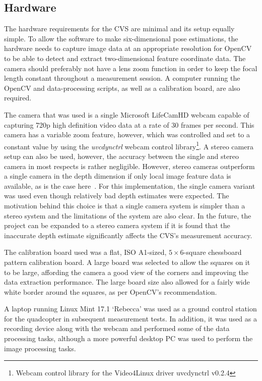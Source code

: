 \subsection{Hardware}

The hardware requirements for the CVS are minimal and its setup equally simple. To allow the software to make six-dimensional pose estimations, the hardware needs to capture image data at an appropriate resolution for OpenCV to be able to detect and extract two-dimensional feature coordinate data. The camera should preferably not have a lens zoom function in order to keep the focal length constant throughout a measurement session. A computer running the OpenCV and data-processing scripts, as well as a calibration board, are also required. 

The camera that was used is a single Microsoft LifeCamHD webcam capable of capturing 720p high definition video data at a rate of 30 frames per second. This camera has a variable zoom feature, however, which was controlled and set to a constant value by using the \emph{uvcdynctrl} webcam control library\footnote{Webcam control library for the Video4Linux driver uvcdynctrl v0.2.4}. A stereo camera setup can also be used, however, the accuracy between the single and stereo camera in most respects is rather negligible. However, stereo cameras outperform a single camera in the depth dimension if only local image feature data is available, as is the case here~\citep{saxena20083}.  For this implementation, the single camera variant was used even though relatively bad depth estimates were expected. The motivation behind this choice is that a single camera system is simpler than a stereo system and the limitations of the system are also clear. In the future, the project can be expanded to a stereo camera system if it is found that the inaccurate depth estimate significantly affects the CVS's measurement accuracy.

The calibration board used was a flat, ISO A1-sized, $5\times6$-square chessboard pattern calibration board. A large board was selected to allow the squares on it to be large, affording the camera a good view of the corners and improving the data extraction performance. The large board size also allowed for a fairly wide white border around the squares, as per OpenCV's recommendation. 

A laptop running Linux Mint 17.1 `Rebecca' was used as a ground control station for the quadcopter in subsequent measurement tests. In addition, it was used as a recording device along with the webcam and performed some of the data processing tasks, although a more powerful desktop PC was used to perform the image processing tasks. 

